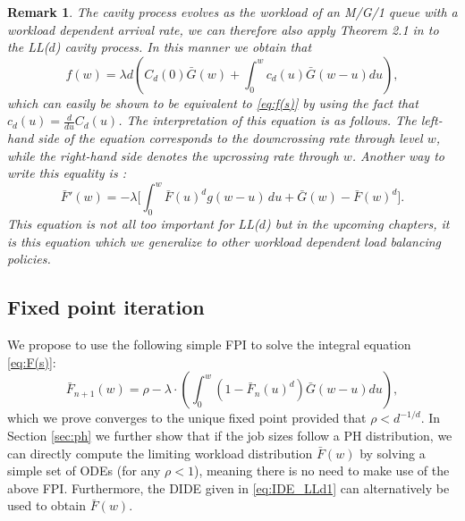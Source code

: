 \documentclass[12pt]{report}
\newtheorem{remark}{Remark}
\begin{document}
\begin{remark}
The cavity process evolves as the workload of an M/G/1 queue with a workload dependent arrival rate, we can therefore also
apply Theorem 2.1 in \cite{bekker2004} to the LL($d$) cavity process. In this manner we obtain that
$$
f(w) = \lambda d \left( C_d(0) \bar G(w) + \int_0^w c_d(u) \bar G(w-u) du \right),
$$
which can easily be shown to be equivalent to \eqref{eq:f(s)} by using the fact that $c_d(u) = \frac{d}{du} C_d(u)$. 
The interpretation of this equation is as follows. The left-hand side of the equation corresponds to the downcrossing rate through level $w$, while the right-hand side denotes the upcrossing rate through $w$. Another way to write this equality is :
\begin{equation}\label{eq:IDE_LLd1}
\bar F'(w) = -\lambda \bigg[ \int_0^w \bar F(u)^d g(w-u) \, du + \bar G(w) - \bar F(w)^d \bigg].
\end{equation}
This equation is not all too important for LL($d$) but in the upcoming chapters, it is this equation which we generalize to other workload dependent load balancing policies.
\end{remark}

\subsection{Fixed point iteration}\label{sec:fixed}
We propose to use the following simple FPI to solve the integral equation
\eqref{eq:F(s)}:
\[\bar F_{n+1}(w) = \rho - \lambda \cdot \left(
\int_{0}^w (1 - \bar{F}_n(u)^d) \bar G(w-u) du
\right),\]
which we prove converges to the unique fixed point provided that $\rho < d^{-1/d}$.
In Section \ref{sec:ph} we further show that if the job sizes follow a PH
distribution, we can directly compute the limiting workload distribution $\bar F(w)$ by solving a 
simple set of ODEs (for any $\rho < 1$), meaning there is no need to 
make use of the above FPI. Furthermore, the DIDE given in \eqref{eq:IDE_LLd1} can alternatively be used to obtain $\bar F(w)$.
\end{document}
